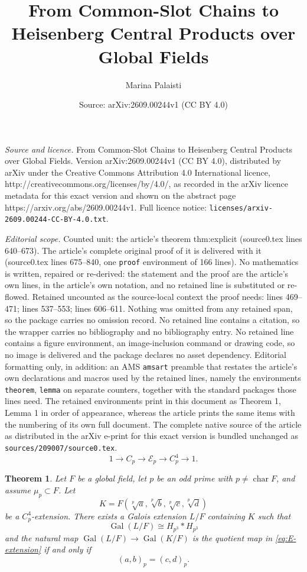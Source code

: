 \documentclass[10pt,a4paper]{amsart}
\title{From Common-Slot Chains to Heisenberg Central Products over Global Fields}
\author{Marina Palaisti}
\date{Source: arXiv:2609.00244v1 (CC BY 4.0)}
\newtheorem{theorem}{Theorem}
\newcommand{\E}{\mathcal E_p}
\DeclareMathOperator{\Gal}{Gal}
\newcommand{\Hp}{H_{p^3}}
\begin{document}
\maketitle

\noindent\emph{Source and licence.} From Common-Slot Chains to Heisenberg Central Products over Global Fields. Version arXiv:2609.00244v1 (CC BY 4.0), distributed by arXiv under the Creative Commons Attribution 4.0 International licence, http://creativecommons.org/licenses/by/4.0/, as recorded in the arXiv licence metadata for this exact version and shown on the abstract page https://arxiv.org/abs/2609.00244v1. Full licence notice: \texttt{licenses/arxiv-2609.00244-CC-BY-4.0.txt}.\par\smallskip

\noindent\textit{Editorial scope.} Counted unit: the article's theorem thm:explicit (source0.tex lines 640--673). The article's complete original proof of it is delivered with it (source0.tex lines 675--840, one \texttt{proof} environment of 166 lines). No mathematics is written, repaired or re-derived: the statement and the proof are the article's own lines, in the article's own notation, and no retained line is substituted or re-flowed.  Retained uncounted as the source-local context the proof needs: lines 469--471; lines 537--553; lines 606--611.  Nothing was omitted from any retained span, so the package carries no omission record.  No retained line contains a citation, so the wrapper carries no bibliography and no bibliography entry.  No retained line contains a figure environment, an image-inclusion command or drawing code, so no image is delivered and the package declares no asset dependency.  Editorial formatting only, in addition: an AMS \texttt{amsart} preamble that restates the article's own declarations and macros used by the retained lines, namely the environments \texttt{theorem}, \texttt{lemma} on separate counters, together with the standard packages those lines need.  The retained environments print in this document as Theorem 1, Lemma 1 in order of appearance, whereas the article prints the same items with the numbering of its own full document.  The complete native source of the article as distributed in the arXiv e-print for this exact version is bundled unchanged as \texttt{sources/209007/source0.tex}.
\begin{equation}\label{eq:E-extension}
 1\longrightarrow C_p\longrightarrow\E\longrightarrow C_p^4\longrightarrow1.
\end{equation}

\begin{theorem}\label{thm:global-realizability}
Let $F$ be a global field, let $p$ be an odd prime with
$p\neq\operatorname{char}F$, and assume $\mu_p\subset F$. Let
\[
 K=F(\sqrt[p]{a},\sqrt[p]{b},\sqrt[p]{c},\sqrt[p]{d})
\]
be a $C_p^4$-extension. There exists a Galois extension $L/F$ containing
$K$ such that
\[
 \Gal(L/F)\cong\Hp*\Hp
\]
and the natural map $\Gal(L/F)\to\Gal(K/F)$ is the quotient map in
\eqref{eq:E-extension} if and only if
\[
 (a,b)_p=(c,d)_p.
\]
\end{theorem}
\end{document}
